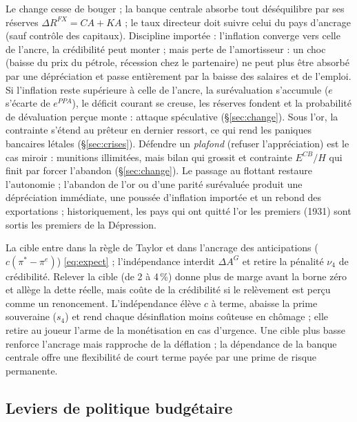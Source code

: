 \documentclass[11pt,a4paper]{article}
\begin{document}
\direct Le change cesse de bouger ; la banque centrale absorbe tout déséquilibre par ses réserves $\Delta R^{FX}=CA+KA$ ; le taux directeur doit suivre celui du pays d'ancrage (sauf contrôle des capitaux).
\second Discipline importée : l'inflation converge vers celle de l'ancre, la crédibilité peut monter ; mais perte de l'amortisseur : un choc (baisse du prix du pétrole, récession chez le partenaire) ne peut plus être absorbé par une dépréciation et passe entièrement par la baisse des salaires et de l'emploi. Si l'inflation reste supérieure à celle de l'ancre, la surévaluation s'accumule ($e$ s'écarte de $e^{PPA}$), le déficit courant se creuse, les réserves fondent et la probabilité de dévaluation perçue monte : attaque spéculative (\S\ref{sec:change}). Sous l'or, la contrainte s'étend au prêteur en dernier ressort, ce qui rend les paniques bancaires létales (\S\ref{sec:crises}).
\baisse Défendre un \emph{plafond} (refuser l'appréciation) est le cas miroir : munitions illimitées, mais bilan qui grossit et contrainte $E^{CB}/H$ qui finit par forcer l'abandon (\S\ref{sec:change}). Le passage au flottant restaure l'autonomie ; l'abandon de l'or ou d'une parité surévaluée produit une dépréciation immédiate, une poussée d'inflation importée et un rebond des exportations ; historiquement, les pays qui ont quitté l'or les premiers (1931) sont sortis les premiers de la Dépression.

\direct La cible entre dans la règle de Taylor et dans l'ancrage des anticipations ($c(\pi^\ast-\pi^e)$) \eqref{eq:expect} ; l'indépendance interdit $\Delta A^G$ et retire la pénalité $\nu_4$ de crédibilité.
\second Relever la cible (de 2 à 4\,\%) donne plus de marge avant la borne zéro et allège la dette réelle, mais coûte de la crédibilité si le relèvement est perçu comme un renoncement. L'indépendance élève $c$ à terme, abaisse la prime souveraine ($s_4$) et rend chaque désinflation moins coûteuse en chômage ; elle retire au joueur l'arme de la monétisation en cas d'urgence.
\baisse Une cible plus basse renforce l'ancrage mais rapproche de la déflation ; la dépendance de la banque centrale offre une flexibilité de court terme payée par une prime de risque permanente.

\subsection{Leviers de politique budgétaire}
\end{document}
